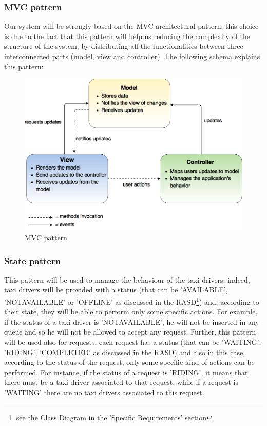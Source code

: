 \subsubsection{MVC pattern}

    Our system will be strongly based on the MVC architectural pattern; this choice is due to the fact that this pattern will help us reducing the complexity of the structure of the system, by distributing all the functionalities between three interconnected parts (model, view and controller).
    \newline
    \newline
    The following schema explains this pattern:
    \begin{figure}[H]
            \centering
            \includegraphics[width=14cm]{./Images/MVC.png}
            \caption{MVC pattern}
    \end{figure}

\subsubsection{State pattern}

    This pattern will be used to manage the behaviour of the taxi drivers; indeed, taxi drivers will be provided with a status (that can be 'AVAILABLE', 'NOTAVAILABLE' or 'OFFLINE' as discussed in the RASD\footnote{\label{note1}see the Class Diagram in the 'Specific Requirements' section}) and, according to their state, they will be able to perform only some specific actions.
    For example, if the status of a taxi driver is 'NOTAVAILABLE', he will not be inserted in any queue and so he will not be allowed to accept any request.
    \newline
    Further, this pattern will be used also for requests; each request has a status (that can be 'WAITING', 'RIDING', 'COMPLETED' as discussed in the RASD\footnotemark[\ref{note1}]) and also in this case, according to the status of the request, only some specific kind of actions can be performed. For instance, if the status of a request is 'RIDING', it means that there must be a taxi driver associated to that request, while if a request is 'WAITING' there are no taxi drivers associated to this request.
    
